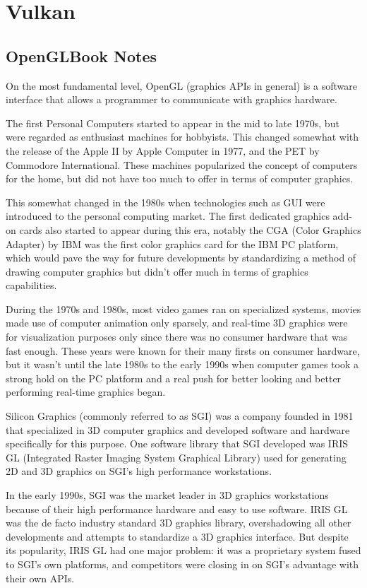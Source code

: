 \chapter{Vulkan}

\section{OpenGLBook Notes}

On the most fundamental level, OpenGL (graphics APIs in general) is a software
interface that allows a programmer to communicate with graphics hardware.

The first Personal Computers started to appear in the mid to late 1970s,
but were regarded as enthusiast machines for hobbyists.
This changed somewhat with the release of the Apple II by Apple Computer in
1977, and the PET by Commodore International. These machines popularized the
concept of computers for the home, but did not have too much to offer in terms
of computer graphics.

This somewhat changed in the 1980s when technologies such as GUI were introduced
to the personal computing market. The first dedicated graphics add-on cards also
started to appear during this era, notably the CGA (Color Graphics Adapter)
by IBM was the first color graphics card for the IBM PC platform, which
would pave the way for future developments by standardizing a method of drawing
computer graphics but didn't offer much in terms of graphics capabilities.

During the 1970s and 1980s, most video games ran on specialized systems,
movies made use of computer animation only sparsely, and real-time 3D
graphics were for visualization purposes only since there was no consumer
hardware that was fast enough.
These years were known for their many firsts on consumer hardware, but
it wasn't until the late 1980s to the early 1990s when computer games took
a strong hold on the PC platform and a real push for better looking and better
performing real-time graphics began.

Silicon Graphics (commonly referred to as SGI) was a company founded in
1981 that specialized in 3D computer graphics and developed software and hardware
specifically for this purpose. One software library that SGI developed was
IRIS GL (Integrated Raster Imaging System Graphical Library) used for generating
2D and 3D graphics on SGI's high performance workstations.

In the early 1990s, SGI was the market leader in 3D graphics workstations
because of their high performance hardware and easy to use software.
IRIS GL was the de facto industry standard 3D graphics library, overshadowing
all other developments and attempts to standardize a 3D graphics interface.
But despite its popularity, IRIS GL had one major problem: it was a proprietary
system fused to SGI's own platforms, and competitors were closing in on SGI's
advantage with their own APIs.

